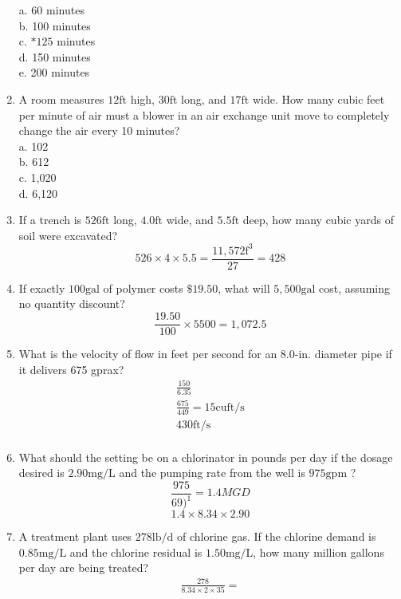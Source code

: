 \begin{enumerate}
a. 60 minutes\\
b. 100 minutes\\
c. $* 125$ minutes\\
d. 150 minutes\\
e. 200 minutes\\
\item A room measures $12 \mathrm{ft}$ high, $30 \mathrm{ft}$ long, and $17 \mathrm{ft}$ wide. How many cubic feet per minute of air must a blower in an air exchange unit move to completely change the air every 10 minutes?\\
a. 102\\
b. 612\\
c. 1,020\\
d. 6,120\\
\item If a trench is $526 \mathrm{ft}$ long, $4.0 \mathrm{ft}$ wide, and $5.5 \mathrm{ft}$ deep, how many cubic yards of soil were excavated?\\
$$
526 \times 4 \times 5.5=\frac{11,572 \mathrm{f}^{3}}{27}=428
$$
\item If exactly $100 \mathrm{gal}$ of polymer costs $\$ 19.50$, what will $5,500 \mathrm{gal}$ cost, assuming no quantity discount?\\
$$
\frac{19.50}{100} \times 5500=1,072.5
$$
\item What is the velocity of flow in feet per second for an 8.0-in. diameter pipe if it delivers 675 gprax?\\
$$
\begin{gathered}
\frac{150}{6.35} \\
\frac{675}{449}=15 \mathrm{cuft} / \mathrm{s} \\
430 \mathrm{ft} / \mathrm{s}\\
\end{gathered}
$$
\item What should the setting be on a chlorinator in pounds per day if the dosage desired is $2.90 \mathrm{mg} / \mathrm{L}$ and the pumping rate from the well is $975 \mathrm{gpm}$ ?\\
$$
\frac{975}{69)^{1}}=1.4 M G D
$$
$$
1.4 \times 8.34 \times 2.90
$$
\item A treatment plant uses $278 \mathrm{lb} / \mathrm{d}$ of chlorine gas. If the chlorine demand is $0.85 \mathrm{mg} / \mathrm{L}$ and the chlorine residual is $1.50 \mathrm{mg} / \mathrm{L}$, how many million gallons per day are being treated?
$$
\begin{gathered}
\frac{278}{8.34 \times 2 \times 35}= \\

\end{gathered}$$
\end{enumerate}
